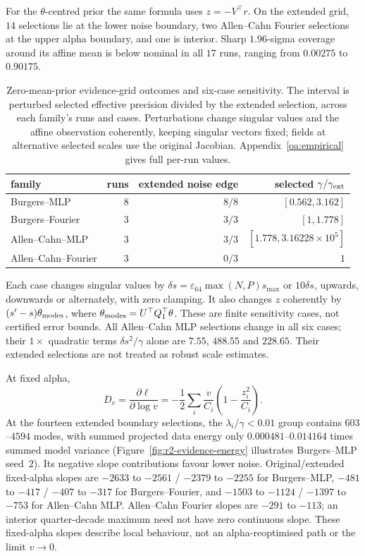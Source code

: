 For the $\theta$-centred prior the same formula uses $z=-V^\top r$. On the extended
grid, $14$ selections lie at the lower noise boundary, two Allen--Cahn Fourier
selections at the upper alpha boundary, and one is interior. Sharp $1.96$-sigma
coverage around its affine mean is below nominal in all $17$ runs,
ranging from $0.00275$ to $0.90175$.

\begin{table}[t]
\centering\small\setlength{\tabcolsep}{4pt}

\begin{tabular}{@{}lrrr@{}}
\toprule
family & runs & extended noise edge & selected $\gamma/\gamma_{\rm ext}$ \\
\midrule
Burgers--MLP & $8$ & $8/8$ & $[0.562,3.162]$ \\
Burgers--Fourier & $3$ & $3/3$ & $[1,1.778]$ \\
Allen--Cahn--MLP & $3$ & $3/3$ & $[1.778,3.16228\times10^5]$ \\
Allen--Cahn--Fourier & $3$ & $0/3$ & $1$ \\
\bottomrule
\end{tabular}
\caption{Zero-mean-prior evidence-grid outcomes and six-case sensitivity. The interval is perturbed
selected effective precision divided by the extended selection, across each family's
runs and cases. Perturbations change singular values and the affine observation
coherently, keeping singular vectors fixed; fields at alternative selected scales use
the original Jacobian. Appendix~\ref{oa:empirical} gives full per-run values.}
\label{tab:r2-evidence-summary}
\end{table}

Each case changes singular values by
$\delta s=\varepsilon_{64}\max(N,P)s_{\max}$ or $10\delta s$, upwards, downwards or
alternately, with zero clamping. It also changes
$z$ coherently by $(s'-s)\theta_{\rm modes}$, where
$\theta_{\rm modes}=U^\top Q_1^\top\theta$. These are finite sensitivity cases, not
certified error bounds. All Allen--Cahn MLP selections change in all six cases;
their $1\times$ quadratic terms $\delta s^2/\gamma$ alone are $7.55$, $488.55$ and
$228.65$. Their extended selections are not treated as robust scale estimates.

At fixed alpha,
\begin{equation}\label{eq:r2-evidence-slope}
 D_v=\frac{\partial\ell}{\partial\log v}
 =-\frac12\sum_i\frac{v}{C_i}\left(1-\frac{z_i^2}{C_i}\right).
\end{equation}
At the fourteen extended boundary selections, the $\lambda_i/\gamma<0.01$ group
contains $603$--$4594$ modes, with summed projected data energy only
$0.000481$--$0.014164$ times summed model variance
(Figure~\ref{fig:r2-evidence-energy} illustrates Burgers--MLP seed~$2$).
Its negative slope contributions
favour lower noise. Original/extended fixed-alpha slopes are $-2633$ to $-2561$ /
$-2379$ to $-2255$ for Burgers--MLP, $-481$ to $-417$ / $-407$ to $-317$ for
Burgers--Fourier, and $-1503$ to $-1124$ / $-1397$ to $-753$ for Allen--Cahn MLP.
Allen--Cahn Fourier slopes are $-291$ to $-113$; an interior quarter-decade maximum
need not have zero continuous slope. These fixed-alpha slopes describe local behaviour,
not an alpha-reoptimised path or the limit $v\to0$.

